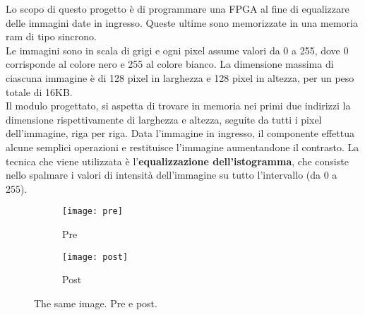 Lo scopo di questo progetto è di programmare una FPGA al fine di equalizzare delle immagini date in ingresso. Queste ultime sono memorizzate in una memoria ram di tipo sincrono.\\
Le immagini sono in scala di grigi e ogni pixel assume valori da 0 a 255, dove 0 corrisponde al colore nero e 255 al colore bianco. La dimensione massima di ciascuna immagine è di 128 pixel in larghezza e 128 pixel in altezza, per un peso totale di 16KB.\\
Il modulo progettato, si aspetta di trovare in memoria nei primi due indirizzi la dimensione rispettivamente di larghezza e altezza, seguite da tutti i pixel dell'immagine, riga per riga. Data l'immagine in ingresso, il componente effettua alcune semplici operazioni e restituisce l'immagine aumentandone il contrasto. La tecnica che viene utilizzata è l'\textbf{equalizzazione dell'istogramma}, che consiste nello spalmare i valori di intensità dell'immagine su tutto l'intervallo  (da 0 a 255).\\

\begin{figure}[h!]
  \centering
  \begin{subfigure}[b]{0.4\linewidth}
    \texttt{[image: pre]}
    \caption{Pre}
  \end{subfigure}
  \begin{subfigure}[b]{0.4\linewidth}
    \texttt{[image: post]}
    \caption{Post}
  \end{subfigure}
  \caption{The same image. Pre e post.}
  \label{fig:coffee}
\end{figure}

